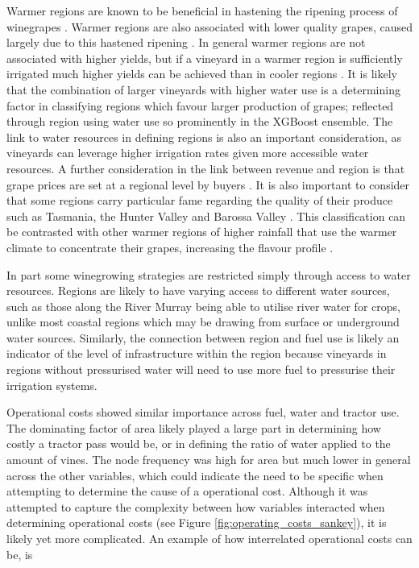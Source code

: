 \documentclass[review,12pt,authoryear]{elsarticle}
\begin{document}
\begin{linenumbers}
Warmer regions are known to be beneficial in hastening the ripening process of winegrapes \citep{webbObservedTrendsWinegrape2011}. Warmer regions are also associated with lower quality grapes, caused largely due to this hastened ripening \citep{botting1996canopy}. In general warmer regions are not associated with higher yields, but if a vineyard in a warmer region is sufficiently irrigated much higher yields can be achieved than in cooler regions \citep{campsGrapeHarvestYield2012}. It is likely that the combination of larger vineyards with higher water use is a determining factor in classifying regions which favour larger production of grapes; reflected through region using water use so prominently in the XGBoost ensemble. The link to water resources in defining regions is also an important consideration, as vineyards can leverage higher irrigation rates given more accessible water resources. A further consideration in the link between revenue and region is that grape prices are set at a regional level by buyers \citep{wineaustraliaNationalVintageReport2022}. It is also important to consider that some regions carry particular fame regarding the quality of their produce such as Tasmania, the Hunter Valley and Barossa Valley \citep{hallidayAustralianWineEncyclopedia2009}. This classification can be contrasted with other warmer regions of higher rainfall that use the warmer climate to concentrate their grapes, increasing the flavour profile \citep{goodwinijeriepRegulatedDeficitIrrigation1992,mgmccarthyEffectCropLoad1986}.
\par
In part some winegrowing strategies are restricted simply through access to water resources. Regions are likely to have varying access to different water sources, such as those along the River Murray being able to utilise river water for crops, unlike most coastal regions which may be drawing from surface or underground water sources. Similarly, the connection between region and fuel use is likely an indicator of the level of infrastructure within the region because vineyards in regions without pressurised water will need to use more fuel to pressurise their irrigation systems.
\par
Operational costs showed similar importance across fuel, water and tractor use. The dominating factor of area likely played a large part in determining how costly a tractor pass would be, or in defining the ratio of water applied to the amount of vines. The node frequency was high for area but much lower in general across the other variables, which could indicate the need to be specific when attempting to determine the cause of a operational cost. Although it was attempted to capture the complexity between how variables interacted when determining operational costs (see Figure \ref{fig:operating_costs_sankey}), it is likely yet more complicated. An example of how interrelated operational costs can be, is 

\end{linenumbers}
\end{document}
